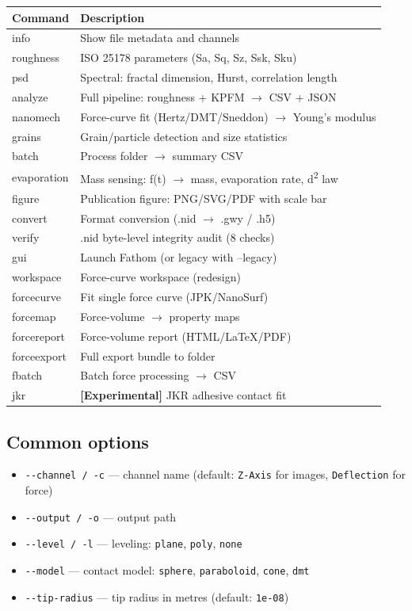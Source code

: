 \documentclass[a4paper,11pt]{article}
\begin{document}
\begin{longtable}{@{}>{\ttfamily}l p{8.5cm}@{}}
\toprule
Command & Description \\
\midrule
info & Show file metadata and channels \\
roughness & ISO 25178 parameters (Sa, Sq, Sz, Ssk, Sku) \\
psd & Spectral: fractal dimension, Hurst, correlation length \\
analyze & Full pipeline: roughness + KPFM $\rightarrow$ CSV + JSON \\
nanomech & Force-curve fit (Hertz/DMT/Sneddon) $\rightarrow$ Young's modulus \\
grains & Grain/particle detection and size statistics \\
batch & Process folder $\rightarrow$ summary CSV \\
evaporation & Mass sensing: f(t) $\rightarrow$ mass, evaporation rate, d\textsuperscript{2} law \\
figure & Publication figure: PNG/SVG/PDF with scale bar \\
convert & Format conversion (.nid $\rightarrow$ .gwy / .h5) \\
verify & .nid byte-level integrity audit (8 checks) \\
gui & Launch Fathom (or legacy with --legacy) \\
workspace & Force-curve workspace (redesign) \\
forcecurve & Fit single force curve (JPK/NanoSurf) \\
forcemap & Force-volume $\rightarrow$ property maps \\
forcereport & Force-volume report (HTML/LaTeX/PDF) \\
forceexport & Full export bundle to folder \\
fbatch & Batch force processing $\rightarrow$ CSV \\
jkr & \textbf{[Experimental]} JKR adhesive contact fit \\
\bottomrule
\end{longtable}

\subsection{Common options}
\begin{itemize}[nosep]
  \item \texttt{-{}-channel / -c} --- channel name (default: \texttt{Z-Axis} for images,
    \texttt{Deflection} for force)
  \item \texttt{-{}-output / -o} --- output path
  \item \texttt{-{}-level / -l} --- leveling: \texttt{plane}, \texttt{poly}, \texttt{none}
  \item \texttt{-{}-model} --- contact model: \texttt{sphere}, \texttt{paraboloid}, \texttt{cone}, \texttt{dmt}
  \item \texttt{-{}-tip-radius} --- tip radius in metres (default: \texttt{1e-08})
\end{itemize}
\end{document}
